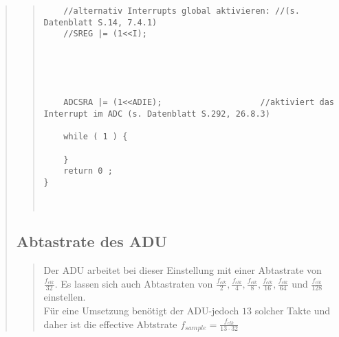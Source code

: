 \begin{quote}
\begin{quote}
\begin{lstlisting}
    //alternativ Interrupts global aktivieren: //(s. Datenblatt S.14, 7.4.1)
    //SREG |= (1<<I);                           
                                            
    



    ADCSRA |= (1<<ADIE);                    //aktiviert das Interrupt im ADC (s. Datenblatt S.292, 26.8.3)

    while ( 1 ) {

    }
    return 0 ;
}



\end{lstlisting}         
    \end{quote}

    \subsection{Abtastrate des ADU}
    \begin{quote}
        Der ADU arbeitet bei dieser Einstellung mit einer Abtastrate von $\frac{f_{clk}}{32}$. Es lassen sich auch
        Abtastraten von $\frac{f_{clk}}{2}, \frac{f_{clk}}{4}, \frac{f_{clk}}{8}, \frac{f_{clk}}{16},
        \frac{f_{clk}}{64}$ und $\frac{f_{clk}}{128}$ einstellen.\\
        Für eine Umsetzung benötigt der ADU-jedoch $13$ solcher Takte und daher ist die effective Abtstrate $f_{sample}
        = \frac{f_{clk}}{13 \cdot   32}$
    \end{quote}

\end{quote}


